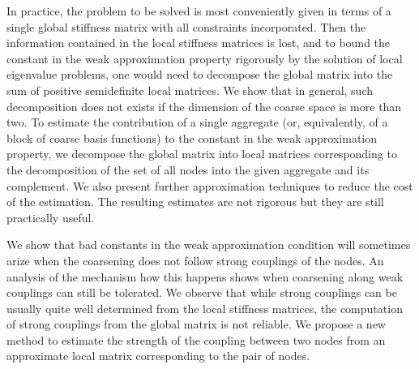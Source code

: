 \documentclass[11pt]{article}
\begin{document}
In practice, the problem to be solved is most conveniently given
in terms of a single global stiffness matrix with all
constraints incorporated. Then the information contained in the
local stiffness matrices is lost, and to bound the constant in
the weak approximation property rigorously by the solution of
local eigenvalue problems, one would need to decompose the
global matrix into the sum of positive semidefinite local
matrices. We show that in general, such decomposition does not
exists if the dimension of the coarse space is more than two. To
estimate the contribution of a single aggregate (or,
equivalently, of a block of coarse basis functions) to the
constant in the weak approximation property, we decompose the
global matrix into local matrices corresponding to the
decomposition of the set of all nodes into the given aggregate
and its complement.  We also present further approximation
techniques to reduce the cost of the estimation.  The resulting
estimates are not rigorous but they are still practically
useful.

We show that bad constants in the weak approximation condition
will sometimes arize when the coarsening does not follow strong
couplings of the nodes. An analysis of the mechanism how this
happens shows when coarsening along weak couplings can still be
tolerated.  We observe that while strong couplings can be
usually quite well determined from the local stiffness matrices,
the computation of strong couplings from the global matrix is
not reliable.  We propose a new method to estimate the strength
of the coupling between two nodes from an approximate local
matrix corresponding to the pair of nodes.


\end{document}
